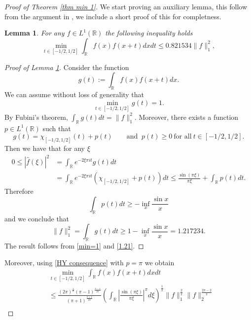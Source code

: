 \documentclass[11pt, reqno]{amsart}
\numberwithin{equation}{section}
\newtheorem{lemma}[theorem]{Lemma}
\newcommand{\R}{{\mathbb R}}
\begin{document}
\begin{proof}[Proof of Theorem \ref{thm min 1}]
We start proving an auxiliary lemma, this follow from the argument in \cite{BarnardSteinerberger}, we include a short proof of this for completness.\\

\begin{lemma}\label{lemma stefan}
For any $f\in L^{1}(\R)$ the following inequality holds
 \begin{equation}\label{stefan}
\min_{t\in[{-1/2,1/2}]}\int_{\R}f(x)f(x+t)dxdt\leq 0.821534\|f\|^2_1,
\end{equation}
\end{lemma}
\begin{proof}[Proof of Lemma \ref{lemma stefan}]
Consider the function
$$ g(t) :=  \int_{\mathbb{R}}{f(x)f(x+t)dx}.$$
We can assume without loss of generality that
\begin{equation}\label{min=1} \min_{t\in[-1/2,1/2]}g(t) = 1.\end{equation}
By Fubini's theorem, $\int_{\mathbb{R}}{g(t) dt} = \|f\|_{1}^2$. Moreover, there exists a function $p\in L^1(\R)$ such that
$$ g(t) =  \chi_{[-1/2,1/2]}(t) + p(t) \qquad \mbox{and }~p(t) \geq 0\ \text{for all} \ t\in[-1/2,1/2].$$
Then we have that for any $\xi$
\begin{align*}
 0 \leq |\widehat{f}(\xi)|^2 &= \int_{\mathbb{R}}{e^{-2\xi \pi i t} g(t)dt} \\
 &= \int_{\mathbb{R}}{e^{-2\xi \pi i t} \left(   \chi_{[-1/2,1/2]} + p(t) \right) dt} 
 \leq \frac{\sin{(\pi \xi)}}{ \pi \xi}+ \int_{\mathbb{R}}{ p(t)dt}.
 \end{align*}
Therefore
$$\int_{\mathbb{R}}{p(t) dt} \geq  - \inf_{x}\frac{\sin{x}}{x}$$
and we conclude that
\begin{equation}\label{1.21}\|f\|^2_1=\int_{\mathbb{R}}{g(t) dt} \geq  1- \inf_{x}\frac{\sin{x}}{x}=1.217234.\end{equation}
The result follows from \eqref{min=1} and \eqref{1.21}.
\end{proof}
Moreover, using \eqref{HY consequence} with $p=\pi$ we obtain
\begin{align*}
    &\min_{t\in[-1/2,1/2]}\int_{\R}f(x)f(x+t) dx dt\nonumber\\
    &\leq \frac{(2\pi)^{\frac{1}{\pi}}(\pi-1)^{\frac{\pi-1}{2\pi}}}{(\pi+1)^{\frac{\pi+1}{2\pi}}}\left(\int_{\R}\left|\frac{\sin(\pi\xi)}{\pi\xi}\right|^{\pi}d\xi\right)^{\frac{1}{\pi}}\|f\|^{\frac{2}{\pi}}_1\|f\|^{\frac{2\pi-2}{\pi}}_2\\

\end{align*}
\end{proof}
\end{document}
